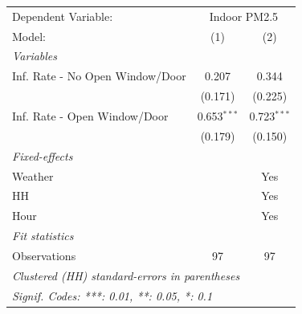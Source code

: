 
\begingroup
\centering
\begin{tabular}{lcc}
   \tabularnewline \midrule \midrule
   Dependent Variable: & \multicolumn{2}{c}{Indoor PM2.5}\\
   Model:                          & (1)           & (2)\\  
   \midrule
   \emph{Variables}\\
   Inf. Rate - No Open Window/Door & 0.207         & 0.344\\   
                                   & (0.171)       & (0.225)\\   
   Inf. Rate - Open Window/Door    & 0.653$^{***}$ & 0.723$^{***}$\\   
                                   & (0.179)       & (0.150)\\   
   \midrule
   \emph{Fixed-effects}\\
   Weather                         &               & Yes\\  
   HH                              &               & Yes\\  
   Hour                            &               & Yes\\  
   \midrule
   \emph{Fit statistics}\\
   Observations                    & 97            & 97\\  
   \midrule \midrule
   \multicolumn{3}{l}{\emph{Clustered (HH) standard-errors in parentheses}}\\
   \multicolumn{3}{l}{\emph{Signif. Codes: ***: 0.01, **: 0.05, *: 0.1}}\\
\end{tabular}
\par\endgroup


